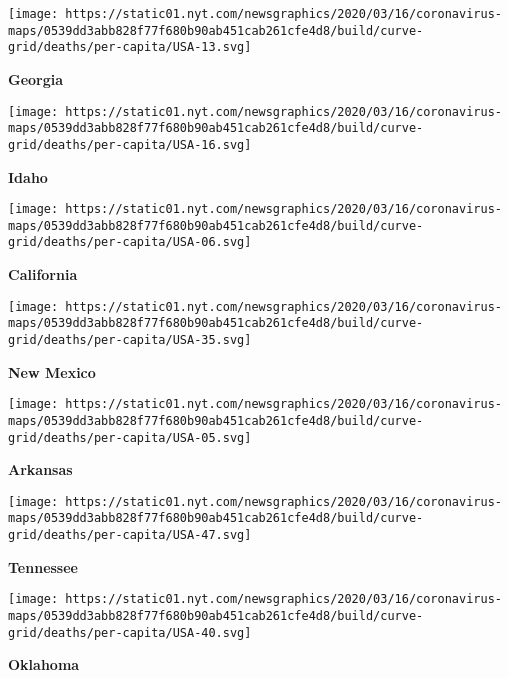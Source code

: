 \texttt{[image: https://static01.nyt.com/newsgraphics/2020/03/16/coronavirus-maps/0539dd3abb828f77f680b90ab451cab261cfe4d8/build/curve-grid/deaths/per-capita/USA-13.svg]}

\textbf{Georgia}

\href{https://www.nytimes.com/interactive/2020/us/idaho-coronavirus-cases.html}{}

\texttt{[image: https://static01.nyt.com/newsgraphics/2020/03/16/coronavirus-maps/0539dd3abb828f77f680b90ab451cab261cfe4d8/build/curve-grid/deaths/per-capita/USA-16.svg]}

\textbf{Idaho}

\href{https://www.nytimes.com/interactive/2020/us/california-coronavirus-cases.html}{}

\texttt{[image: https://static01.nyt.com/newsgraphics/2020/03/16/coronavirus-maps/0539dd3abb828f77f680b90ab451cab261cfe4d8/build/curve-grid/deaths/per-capita/USA-06.svg]}

\textbf{California}

\href{https://www.nytimes.com/interactive/2020/us/new-mexico-coronavirus-cases.html}{}

\texttt{[image: https://static01.nyt.com/newsgraphics/2020/03/16/coronavirus-maps/0539dd3abb828f77f680b90ab451cab261cfe4d8/build/curve-grid/deaths/per-capita/USA-35.svg]}

\textbf{New Mexico}

\href{https://www.nytimes.com/interactive/2020/us/arkansas-coronavirus-cases.html}{}

\texttt{[image: https://static01.nyt.com/newsgraphics/2020/03/16/coronavirus-maps/0539dd3abb828f77f680b90ab451cab261cfe4d8/build/curve-grid/deaths/per-capita/USA-05.svg]}

\textbf{Arkansas}

\href{https://www.nytimes.com/interactive/2020/us/tennessee-coronavirus-cases.html}{}

\texttt{[image: https://static01.nyt.com/newsgraphics/2020/03/16/coronavirus-maps/0539dd3abb828f77f680b90ab451cab261cfe4d8/build/curve-grid/deaths/per-capita/USA-47.svg]}

\textbf{Tennessee}

\href{https://www.nytimes.com/interactive/2020/us/oklahoma-coronavirus-cases.html}{}

\texttt{[image: https://static01.nyt.com/newsgraphics/2020/03/16/coronavirus-maps/0539dd3abb828f77f680b90ab451cab261cfe4d8/build/curve-grid/deaths/per-capita/USA-40.svg]}

\textbf{Oklahoma}

